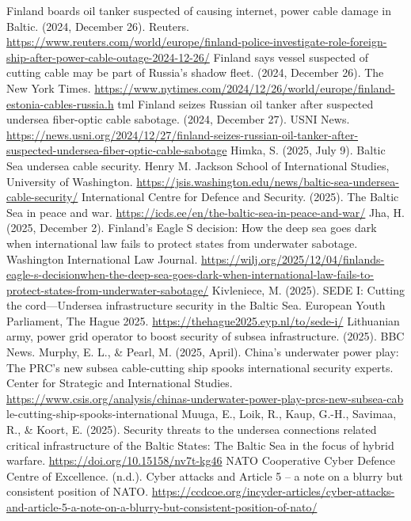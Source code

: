 \begin{referencelist}
   Finland boards oil tanker suspected of causing internet, power cable damage in Baltic. (2024, December 26). Reuters. \url{https://www.reuters.com/world/europe/finland-police-investigate-role-foreign-ship-after-power-cable-outage-2024-12-26/}
   Finland says vessel suspected of cutting cable may be part of Russia's shadow fleet. (2024, December 26). The New York Times. \url{https://www.nytimes.com/2024/12/26/world/europe/finland-estonia-cables-russia.h} tml
   Finland seizes Russian oil tanker after suspected undersea fiber-optic cable sabotage. (2024, December 27). USNI News. \url{https://news.usni.org/2024/12/27/finland-seizes-russian-oil-tanker-after-suspected-undersea-fiber-optic-cable-sabotage}
   Himka, S. (2025, July 9). Baltic Sea undersea cable security. Henry M. Jackson School of International Studies, University of Washington. \url{https://jsis.washington.edu/news/baltic-sea-undersea-cable-security/}
   International Centre for Defence and Security. (2025). The Baltic Sea in peace and war. \url{https://icds.ee/en/the-baltic-sea-in-peace-and-war/}
   Jha, H. (2025, December 2). Finland's Eagle S decision: How the deep sea goes dark when international law fails to protect states from underwater sabotage. Washington International Law Journal. \url{https://wilj.org/2025/12/04/finlands-eagle-s-decisionwhen-the-deep-sea-goes-dark-when-international-law-fails-to-protect-states-from-underwater-sabotage/}
   Kivleniece, M. (2025). SEDE I: Cutting the cord—Undersea infrastructure security in the Baltic Sea. European Youth Parliament, The Hague 2025. \url{https://thehague2025.eyp.nl/to/sede-i/}
   Lithuanian army, power grid operator to boost security of subsea infrastructure. (2025). BBC News.
   Murphy, E. L., \& Pearl, M. (2025, April). China's underwater power play: The PRC's new subsea cable-cutting ship spooks international security experts. Center for Strategic and International Studies. \url{https://www.csis.org/analysis/chinas-underwater-power-play-prcs-new-subsea-cab} le-cutting-ship-spooks-international
   Muuga, E., Loik, R., Kaup, G.-H., Savimaa, R., \& Koort, E. (2025). Security threats to the undersea connections related critical infrastructure of the Baltic States: The Baltic Sea in the focus of hybrid warfare. \url{https://doi.org/10.15158/nv7t-kg46}
   NATO Cooperative Cyber Defence Centre of Excellence. (n.d.). Cyber attacks and Article 5 – a note on a blurry but consistent position of NATO. \url{https://ccdcoe.org/incyder-articles/cyber-attacks-and-article-5-a-note-on-a-blurry-but-consistent-position-of-nato/}

\end{referencelist}
